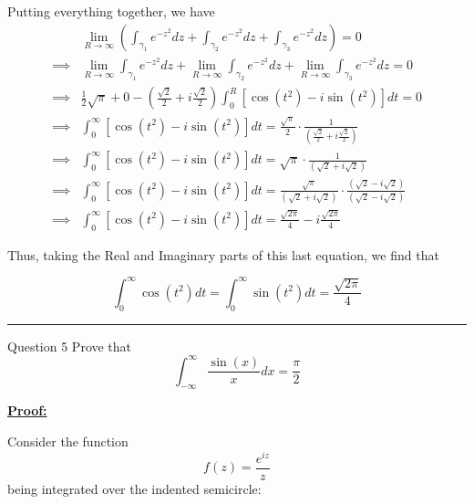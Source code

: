 \documentclass{article}
\begin{document}
\vskip 0.5cm
Putting everything together, we have 
\begin{align*}
  &\lim_{R \rightarrow \infty}\left(\int_{{\gamma_1}} e^{-z^2} dz + \int_{{\gamma_2}} e^{-z^2} dz + \int_{{\gamma_3}} e^{-z^2} dz\right) = 0 \\
  \implies& \lim_{R \rightarrow \infty}\int_{{\gamma_1}} e^{-z^2} dz + \lim_{R \rightarrow \infty} \int_{{\gamma_2}} e^{-z^2} dz +  \lim_{R \rightarrow \infty}\int_{{\gamma_3}} e^{-z^2} dz = 0 \\
  \implies& \frac{1}{2}\sqrt{\pi} + 0  - \left( \frac{\sqrt{2}}{2} + i \frac{\sqrt{2}}{2} \right)\int_{0}^{R} \left[\cos(t^2) - i\sin(t^2)\right] dt  = 0 \\
  \implies & \int_{0}^{\infty} \left[\cos(t^2) - i\sin(t^2)\right] dt = \frac{\sqrt{\pi}}{2} \cdot \frac{1}{\left( \frac{\sqrt{2}}{2} + i \frac{\sqrt{2}}{2} \right)} \\
  \implies & \int_{0}^{\infty} \left[\cos(t^2) - i\sin(t^2)\right] dt = \sqrt{\pi} \cdot \frac{1}{\left( \sqrt{2} + i \sqrt{2} \right)} \\
  \implies & \int_{0}^{\infty} \left[\cos(t^2) - i\sin(t^2)\right] dt = \frac{\sqrt{\pi}}{\left( \sqrt{2} + i \sqrt{2} \right)} \cdot \frac{\left( \sqrt{2} - i \sqrt{2} \right)}{\left( \sqrt{2} - i \sqrt{2} \right)}  \\
  \implies & \int_{0}^{\infty} \left[\cos(t^2) - i\sin(t^2)\right] dt = \frac{\sqrt{2\pi}}{4} - i\frac{\sqrt{2\pi}}{4}
\end{align*}

Thus, taking the Real and Imaginary parts of this last equation, we find that 

\[ \boxed{ \int_{0}^{\infty} \cos\left(t^2\right)dt = \int_{0}^{\infty} \sin\left(t^2\right)dt = \frac{\sqrt{2\pi}}{4}} \]
\vskip 0.5cm
\hrule 
\vskip 0.5cm


\begin{mathdefinitionbox}{Question 5}
\vskip 0.5cm
Prove that 
\[ \int_{-\infty}^{\infty} \frac{\sin(x)}{x} dx = \frac{\pi}{2} \]
\end{mathdefinitionbox}

\vskip 0.5cm
\underline{\textbf{Proof:}}

\vskip 0.5cm
Consider the function \[ f(z) = \frac{e^{iz}}{z} \] being integrated over the indented semicircle:
\end{document}
